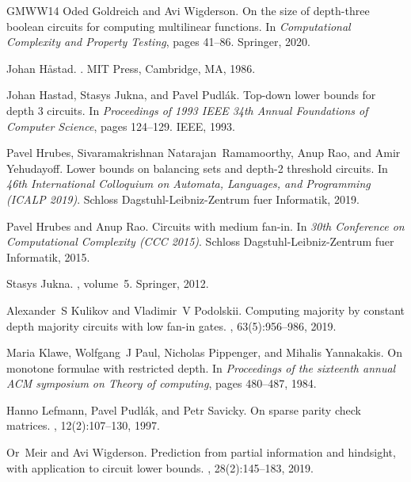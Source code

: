 \documentclass[10pt,a4paper]{article}
\theoremstyle{definition}
\theoremstyle{remark}
\begin{document}
\begin{thebibliography}{GMWW14}
Oded Goldreich and Avi Wigderson.
\newblock On the size of depth-three boolean circuits for computing multilinear
  functions.
\newblock In {\em Computational Complexity and Property Testing}, pages 41--86.
  Springer, 2020.

Johan H{\aa}stad.
.
\newblock MIT Press, Cambridge, MA, 1986.

Johan Hastad, Stasys Jukna, and Pavel Pudl{\'a}k.
\newblock Top-down lower bounds for depth 3 circuits.
\newblock In {\em Proceedings of 1993 IEEE 34th Annual Foundations of Computer
  Science}, pages 124--129. IEEE, 1993.

Pavel Hrubes, Sivaramakrishnan Natarajan~Ramamoorthy, Anup Rao, and Amir
  Yehudayoff.
\newblock Lower bounds on balancing sets and depth-2 threshold circuits.
\newblock In {\em 46th International Colloquium on Automata, Languages, and
  Programming (ICALP 2019)}. Schloss Dagstuhl-Leibniz-Zentrum fuer Informatik,
  2019.

Pavel Hrubes and Anup Rao.
\newblock Circuits with medium fan-in.
\newblock In {\em 30th Conference on Computational Complexity (CCC 2015)}.
  Schloss Dagstuhl-Leibniz-Zentrum fuer Informatik, 2015.

Stasys Jukna.
, volume~5.
\newblock Springer, 2012.

Alexander~S Kulikov and Vladimir~V Podolskii.
\newblock Computing majority by constant depth majority circuits with low
  fan-in gates.
, 63(5):956--986, 2019.

Maria Klawe, Wolfgang~J Paul, Nicholas Pippenger, and Mihalis Yannakakis.
\newblock On monotone formulae with restricted depth.
\newblock In {\em Proceedings of the sixteenth annual ACM symposium on Theory
  of computing}, pages 480--487, 1984.

Hanno Lefmann, Pavel Pudl{\'a}k, and Petr Savicky.
\newblock On sparse parity check matrices.
, 12(2):107--130, 1997.

Or~Meir and Avi Wigderson.
\newblock Prediction from partial information and hindsight, with application
  to circuit lower bounds.
, 28(2):145--183, 2019.


\end{thebibliography}
\end{document}
